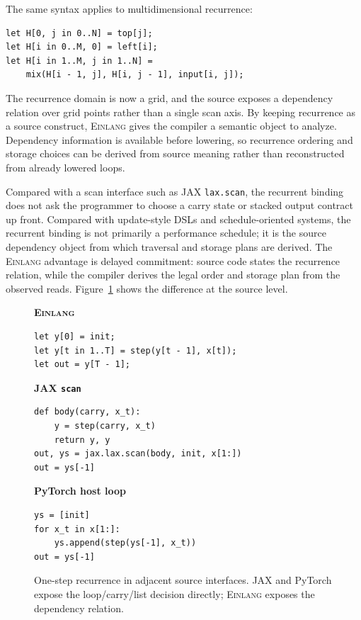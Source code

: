 \documentclass[sigplan,screen,nonacm]{acmart}
\newcommand{\einlang}{\textsc{Einlang}}
\begin{document}
The same syntax applies to multidimensional recurrence:
\begin{lstlisting}[style=einlang]
let H[0, j in 0..N] = top[j];
let H[i in 0..M, 0] = left[i];
let H[i in 1..M, j in 1..N] =
    mix(H[i - 1, j], H[i, j - 1], input[i, j]);
\end{lstlisting}
The recurrence domain is now a grid, and the source exposes a dependency relation over grid points rather than a single scan axis. By keeping recurrence as a source construct, \einlang{} gives the compiler a semantic object to analyze. Dependency information is available before lowering, so recurrence ordering and storage choices can be derived from source meaning rather than reconstructed from already lowered loops.

Compared with a scan interface such as JAX \texttt{lax.scan}, the recurrent binding does not ask the programmer to choose a carry state or stacked output contract up front. Compared with update-style DSLs and schedule-oriented systems, the recurrent binding is not primarily a performance schedule; it is the source dependency object from which traversal and storage plans are derived. The \einlang{} advantage is delayed commitment: source code states the recurrence relation, while the compiler derives the legal order and storage plan from the observed reads. Figure~\ref{fig:recurrence-code-comparison} shows the difference at the source level.

\begin{figure}[t]
\centering
\begin{minipage}[t]{0.98\linewidth}
\textbf{\einlang{}}
\begin{lstlisting}[style=einlang]
let y[0] = init;
let y[t in 1..T] = step(y[t - 1], x[t]);
let out = y[T - 1];
\end{lstlisting}
\end{minipage}

\vspace{0.25\baselineskip}
\begin{minipage}[t]{0.98\linewidth}
\textbf{JAX \texttt{scan}}
\begin{lstlisting}[style=pythoncode]
def body(carry, x_t):
    y = step(carry, x_t)
    return y, y
out, ys = jax.lax.scan(body, init, x[1:])
out = ys[-1]
\end{lstlisting}
\end{minipage}

\vspace{0.25\baselineskip}
\begin{minipage}[t]{0.98\linewidth}
\textbf{PyTorch host loop}
\begin{lstlisting}[style=pythoncode]
ys = [init]
for x_t in x[1:]:
    ys.append(step(ys[-1], x_t))
out = ys[-1]
\end{lstlisting}
\end{minipage}
\caption{One-step recurrence in adjacent source interfaces. JAX and PyTorch expose the loop/carry/list decision directly; \einlang{} exposes the dependency relation.}
\label{fig:recurrence-code-comparison}
\end{figure}
\end{document}
